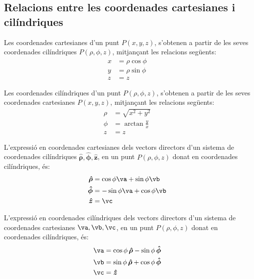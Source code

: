 \documentclass[catalan,a4paper,twoside,11pt]{article}
\begin{document}
\subsection{Relacions entre les coordenades cartesianes i
cilíndriques}

Les coordenades cartesianes  d'un punt $P(x,y,z)$, s'obtenen a partir
de les seves coordenades cilíndriques $P(\rho,\phi,z)$,
mitjançant les relacions següents:
\begin{subequations}\begin{align}
    x &=\rho\cos\phi \\ y &=\rho\sin\phi \\ z &=z
\end{align}\end{subequations}

Les coordenades  cilíndriques  d'un punt $P(\rho,\phi,z)$,
s'obtenen a partir de les seves coordenades cartesianes $P(x,y,z)$,
mitjançant les relacions següents:
\begin{subequations}\begin{align}
    \rho &= \sqrt{x^2+y^2}\\
    \phi &=  \arctan\frac{y}{x}\\
    z &= z
\end{align}\end{subequations}

L'expressió en coordenades cartesianes dels vectors directors d'un sistema de coordenades  cilíndriques $\boldsymbol{\hat{\rho}},\boldsymbol{\hat{\phi}},\boldsymbol{\hat{z}}$, en un punt $P(\rho,\phi,z)$ donat en coordenades cilíndriques, és:
\begin{subequations}\begin{align}
    \boldsymbol{\hat{\rho}} &=\cos\phi\va+\sin\phi\vb \\
    \boldsymbol{\hat{\phi}} &=-\sin\phi\va+\cos\phi\vb \\
    \boldsymbol{\hat{z}} &=\vc
\end{align}\end{subequations}

L'expressió en coordenades cilíndriques dels vectors directors d'un sistema de coordenades  cartesianes $\va,\vb,\vc$, en un punt $P(\rho,\phi,z)$ donat en coordenades cilíndriques, és:
\begin{subequations}\begin{align}
    \va &=\cos\phi\,\boldsymbol{\hat{\rho}}-\sin\phi\,\boldsymbol{\hat{\phi}} \\
    \vb &=\sin\phi\,\boldsymbol{\hat{\rho}}+\cos\phi\,\boldsymbol{\hat{\phi}} \\
    \vc &=\boldsymbol{\hat{z}}
\end{align}\end{subequations}
\end{document}
